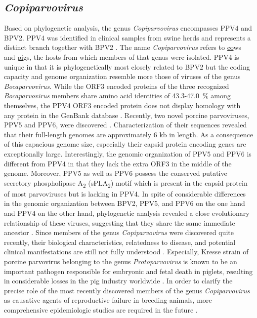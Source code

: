 \subsection{\textit{Copiparvovirus}}
Based on phylogenetic analysis, the genus \textit{Copiparvovirus} encompasses PPV4 and BPV2. PPV4 was identified in clinical samples from swine herds \cite{pmid20339886, pmid21092136, pmid22967311} and represents a distinct branch together with BPV2 \cite{pmid11562506}. The name \textit{Copiparvovirus} refers to \underline{co}ws and \underline{pi}gs, the hosts from which members of that genus were isolated. PPV4 is unique in that it is phylogenetically most closely related to BPV2 but the coding capacity and genome organization resemble more those of viruses of the genus \textit{Bocaparvovirus}. While the ORF3 encoded proteins of the three recognized \textit{Bocaparvovirus} members share amino acid identities of 43.3-47.0~\% among themselves, the PPV4 ORF3 encoded protein does not display homology with any protein in the GenBank database \cite{pmid20339886, pmid21092136}. 
Recently, two novel porcine parvoviruses, PPV5 and PPV6, were discovered \cite{pmid23405295, pmid25442288}. Characterization of their sequences revealed that their full-length genomes are approximately 6 kb in length. As a consequence of this capacious genome size, especially their capsid protein encoding genes are exceptionally large. Interestingly, the genomic organization of PPV5 and PPV6 is different from PPV4 in that they lack the extra ORF3 in the middle of the genome. Moreover, PPV5 as well as PPV6 possess the conserved putative secretory phospholipase A\textsubscript{2} (sPLA\textsubscript{2}) motif which is present in the capsid protein of most parvoviruses but is lacking in PPV4. In spite of considerable differences in the genomic organization between BPV2, PPV5, and PPV6 on the one hand and PPV4 on the other hand, phylogenetic analysis revealed a close evolutionary relationship of these viruses, suggesting that they share the same immediate ancestor \cite{pmid23762339, pmid25442288}.      
Since members of the genus \textit{Copiparvovirus} were discovered quite recently, their biological characteristics, relatedness to disease, and potential clinical manifestations are still not fully understood \cite{pmid20339886, pmid21092136, pmid23762339, pmid25442288}. Especially, Kresse strain of porcine parvovirus belonging to the genus \textit{Protoparvovirus} is known to be an important pathogen responsible for embryonic and fetal death in piglets, resulting in considerable losses in the pig industry worldwide \cite{pmid6314634, pmid427636, pmid999067, pmid3006323}. In order to clarify the precise role of the most recently discovered members of the genus \textit{Copiparvovirus} as causative agents of reproductive failure in breeding animals, more comprehensive epidemiologic studies are required in the future \cite{pmid25442288}. 




